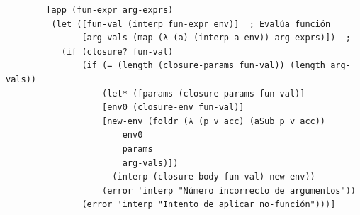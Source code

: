 \documentclass[11pt]{article}
\begin{document}
\begin{enumerate}
      \begin{verbatim}
        [app (fun-expr arg-exprs)  
         (let ([fun-val (interp fun-expr env)]  ; Evalúa función
               [arg-vals (map (λ (a) (interp a env)) arg-exprs)])  ;
           (if (closure? fun-val)  
               (if (= (length (closure-params fun-val)) (length arg-vals))
                   (let* ([params (closure-params fun-val)]
                   [env0 (closure-env fun-val)]
                   [new-env (foldr (λ (p v acc) (aSub p v acc))
                       env0
                       params
                       arg-vals)])
                     (interp (closure-body fun-val) new-env))
                   (error 'interp "Número incorrecto de argumentos"))
               (error 'interp "Intento de aplicar no-función")))]
      \end{verbatim}
\end{enumerate}
\end{document}
